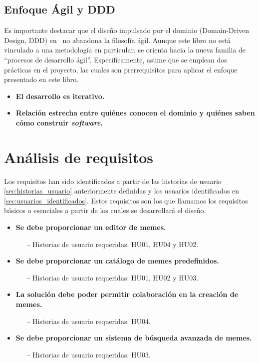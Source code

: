 \subsection{Enfoque Ágil y DDD}

Es importante destacar que el diseño impulsado por el dominio (Domain-Driven Design, DDD) en~\cite{evans2004domain} no abandona la filosofía ágil. Aunque este libro no está vinculado a una metodología en particular, se orienta hacia la nueva familia de ``procesos de desarrollo ágil''. Específicamente, asume que se emplean dos prácticas en el proyecto, las cuales son prerrequisitos para aplicar el enfoque presentado en este libro.

\begin{itemize}
    \item \textbf{El desarrollo es iterativo.}
    \item \textbf{Relación estrecha entre quiénes conocen el dominio y quiénes saben cómo construir \textit{software}.}
\end{itemize}

\section{Análisis de requisitos}

Los requisitos han sido identificados a partir de las historias de usuario \ref{sec:historias_usuario} anteriormente definidas y los usuarios identificados en \ref{sec:usuarios_identificados}. Estos requisitos son los que llamamos los requisitos básicos o esenciales a partir de los cuales se desarrollará el diseño.

\begin{itemize}
    \item \textbf{Se debe proporcionar un editor de memes.}
    \begin{itemize}
        \item[-] Historias de usuario requeridas: HU01, HU04 y HU02.
    \end{itemize}
    \item \textbf{Se debe proporcionar un catálogo de memes predefinidos.}
    \begin{itemize}
        \item[-] Historias de usuario requeridas: HU01, HU02 y HU03.
    \end{itemize}
    \item \textbf{La solución debe poder permitir colaboración en la creación de memes.}
    \begin{itemize}
        \item[-] Historias de usuario requeridas: HU04.
    \end{itemize}
    \item \textbf{Se debe proporcionar un sistema de búsqueda avanzada de memes.}
    \begin{itemize}
        \item[-] Historias de usuario requeridas: HU03.
    \end{itemize} 
\end{itemize}

